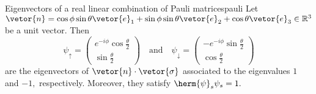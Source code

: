 \begin{lemma}{Eigenvectors of a real linear combination of Pauli matrices}{pauli}
   Let \(\vetor{n} = \cos\phi \sin \theta \vetor{e}_1 +   \sin\phi \sin\theta \vetor{e}_2 + \cos\theta \vetor{e}_3 \in \mathbb{R}^3\) be a unit vector. Then 
   \begin{equation*}
      \psi_{\uparrow} = \begin{pmatrix}
         e^{-i\phi}\cos\frac\theta2\\
         \sin\frac\theta2
      \end{pmatrix}
      \quad\text{and}\quad
      \psi_\downarrow = \begin{pmatrix}
         -e^{-i\phi}\sin\frac\theta2\\
         \cos\frac\theta2
      \end{pmatrix}
   \end{equation*}
   are the eigenvectors of \(\vetor{n} \cdot \vetor{\sigma}\) associated to the eigenvalues \(1\) and \(-1,\) respectively. Moreover, they satisfy \(\herm{\psi}_s \psi_s = 1.\)
\end{lemma}
